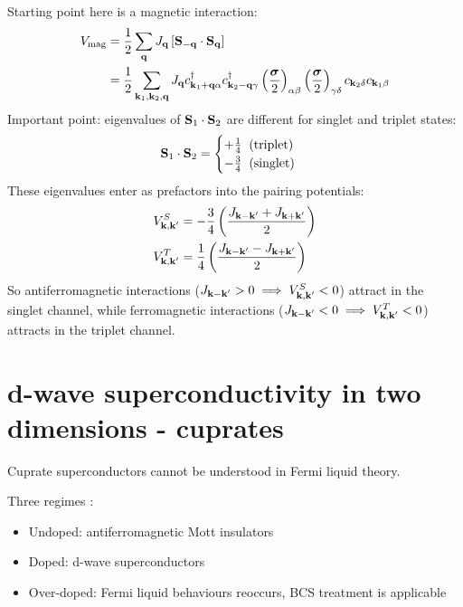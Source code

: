 \documentclass[../main.tex]{subfiles}
\begin{document}
Starting point here is a magnetic interaction:
\begin{align}
    V_{\text{mag}} &= \frac{1}{2} \sum_{\bm{\mathrm{q}}} J_{\bm{\mathrm{q}}} \left[\bm{\mathrm{S}}_{-\bm{\mathrm{q}}} \cdot \bm{\mathrm{S}}_{\bm{\mathrm{q}}}\right] \\
    &= \frac{1}{2} \sum_{\bm{\mathrm{k}}_1, \bm{\mathrm{k}}_2, \bm{\mathrm{q}}} J_{\bm{\mathrm{q}}} c_{\bm{\mathrm{k}}_1 + \bm{\mathrm{q}} \alpha}^{\dagger} c_{\bm{\mathrm{k}}_2 - \bm{\mathrm{q}} \gamma}^{\dagger} \left( \frac{\bm{\mathrm{\sigma}}}{2} \right)_{\alpha \beta} \left( \frac{\bm{\mathrm{\sigma}}}{2} \right)_{\gamma \delta} c_{\bm{\mathrm{k}}_2 \delta} c_{\bm{\mathrm{k}}_1 \beta}
\end{align}
Important point: eigenvalues of \(\bm{\mathrm{S}}_1 \cdot \bm{\mathrm{S}}_2\) are different for singlet and triplet states:
\begin{equation}
    \bm{\mathrm{S}}_1 \cdot \bm{\mathrm{S}}_2 =
    \begin{cases}
        + \frac{1}{4} \;\; \text{(triplet)} \\
        - \frac{3}{4} \;\; \text{(singlet)}
    \end{cases}
\end{equation}
These eigenvalues enter as prefactors into the pairing potentials:
\begin{align}
    V_{\bm{\mathrm{k}}, \bm{\mathrm{k}}^{\prime}}^S &= -\frac{3}{4} \left( \frac{J_{\bm{\mathrm{k}} - \bm{\mathrm{k}}^{\prime}} + J_{\bm{\mathrm{k}} + \bm{\mathrm{k}}^{\prime}}}{2} \right) \\
    V_{\bm{\mathrm{k}}, \bm{\mathrm{k}}^{\prime}}^T &= \frac{1}{4} \left( \frac{J_{\bm{\mathrm{k}} - \bm{\mathrm{k}}^{\prime}} - J_{\bm{\mathrm{k}} + \bm{\mathrm{k}}^{\prime}}}{2} \right)
\end{align}
So antiferromagnetic interactions (\(J_{\bm{\mathrm{k}}-\bm{\mathrm{k}}^{\prime}} > 0 \implies V_{\bm{\mathrm{k}}, \bm{\mathrm{k}}^{\prime}}^S < 0\)) attract in the singlet channel, while ferromagnetic interactions (\(J_{\bm{\mathrm{k}}-\bm{\mathrm{k}}^{\prime}} < 0 \implies V_{\bm{\mathrm{k}}, \bm{\mathrm{k}}^{\prime}}^T < 0\)) attracts in the triplet channel.

\section{d-wave superconductivity in two dimensions - cuprates}

Cuprate superconductors  cannot be understood in Fermi liquid theory.

Three regimes :
\begin{itemize}
    \item Undoped: antiferromagnetic Mott insulators
    \item Doped: d-wave superconductors
    \item Over-doped: Fermi liquid behaviours reoccurs, BCS treatment is applicable  
\end{itemize}
\end{document}
